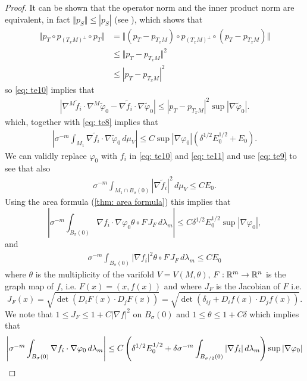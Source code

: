 \begin{proof}
It can be shown that the operator norm and the inner product norm are equivalent, in fact $\Vert p_S\Vert \le |p_S|$ (see \cite{simon2014introduction}), which shows that
\begin{align}
    \Vert p_T \circ p_{(T_xM)^{\perp}} \circ p_T \Vert &= \Vert (p_T - p_{T_xM}) \circ p_{(T_xM)^{\perp}} \circ (p_T - p_{T_xM}) \Vert \\
    &\le \Vert p_T - p_{T_xM} \Vert^2 \\
    &\le |p_T - p_{T_xM}|^2
\end{align}
so \eqref{eq: te10} implies that
\begin{align}
    |\nabla^M \tilde f_i \cdot \nabla^M \tilde\varphi_0 - \nabla \tilde f_i \cdot \nabla \tilde \varphi_0| \le |p_T - p_{T_xM}|^2 \sup|\nabla\tilde\varphi_0|.\label{eq: te11}
\end{align}
which, together with \eqref{eq: te8} implies that
\begin{align}
    \left| \sigma^{-m} \int_{M_1} \nabla\tilde f_i \cdot \nabla\tilde\varphi_0\, d\mu_V\right| \le C\sup|\nabla \varphi_0| (\delta^{1/2}E_0^{1/2} + E_0).
\end{align}
We can validly replace $\varphi_0$ with $f_i$ in \eqref{eq: te10} and \eqref{eq: te11} and use \eqref{eq: te9} to see that also
\begin{align}
    \sigma^{-m} \int_{M_1 \cap B_{\sigma}(0)} |\nabla \tilde f_i|^2\, d\mu_V \le CE_0.
\end{align}
Using the area formula (\cref{thm: area formula}) this implies that
\[
    \left| \sigma^{-m} \int_{B_{\sigma}(0)} \nabla f_i \cdot \nabla\varphi_0 \theta \circ F\, J_F\, d\lambda_m \right| \le C\delta^{1/2} E_0^{1/2} \sup|\nabla \varphi_0|,
\]
and
\begin{align}
    \sigma^{-m} \int_{B_{\sigma}(0)} |\nabla f_i|^2 \theta \circ F\, J_F\, d\lambda_m \le CE_0
\end{align}
where $\theta$ is the multiplicity of the varifold $V=V(M,\theta)$, $F:\mathbb{R}^m \to \mathbb{R}^n$ is the graph map of $f$, i.e. $F(x) = (x,f(x))$ and where $J_F$ is the Jacobian of $F$ i.e.
\[
    J_F(x) = \sqrt{\det(D_i F(x) \cdot D_j F(x)) } = \sqrt{ \det( \delta_{ij} + D_i f(x) \cdot D_jf(x) ) }.
\]
We note that $1 \le J_F \le 1 + C|\nabla f|^2$ on $B_{\sigma}(0)$ and $1 \le \theta \le 1 + C\delta$ which implies that
\begin{align}
    \left| \sigma^{-m} \int_{B_{\sigma}(0)} \nabla f_i \cdot \nabla\varphi_0 \, d\lambda_m \right| &\le C\paren{\delta^{1/2}E_0^{1/2} + \delta\sigma^{-m} \int_{B_{\sigma/2}(0)} |\nabla f_i| \, d\lambda_m }\sup|\nabla\varphi_0| \nonumber\\

\end{align}
\end{proof}
